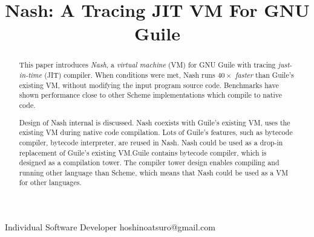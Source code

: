 \documentclass[preprint, 10pt]{sigplanconf}
\begin{document}
\setlength{\pdfpageheight}{\paperheight}
\setlength{\pdfpagewidth}{\paperwidth}




\title{Nash: A Tracing JIT VM For GNU Guile}

           {Individual Software Developer}
           {hoshinoatsuro@gmail.com}

\maketitle

\begin{abstract}

This paper introduces \textit{Nash}, a \textit{virtual machine} (VM) for GNU
Guile with tracing \textit{just-in-time} (JIT) compiler. When conditions were
met, Nash runs \textit{$40\times$ faster} than Guile's existing VM, without
modifying the input program source code. Benchmarks have shown performance close
to other Scheme implementations which compile to native code.

Design of Nash internal is discussed. Nash coexists with Guile's existing VM,
uses the existing VM during native code compilation. Lots of Guile's features,
such as bytecode compiler, bytecode interpreter, are reused in Nash. Nash could
be used as a drop-in replacement of Guile's existing VM.\@ Guile contains
bytecode compiler, which is designed as a compilation tower. The compiler tower
design enables compiling and running other language than Scheme, which means
that Nash could be used as a VM for other languages.
\end{abstract}


\end{document}
